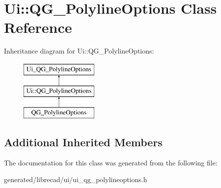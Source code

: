 \hypertarget{classUi_1_1QG__PolylineOptions}{\section{Ui\-:\-:Q\-G\-\_\-\-Polyline\-Options Class Reference}
\label{classUi_1_1QG__PolylineOptions}
}
Inheritance diagram for Ui\-:\-:Q\-G\-\_\-\-Polyline\-Options\-:\begin{figure}[H]
\begin{center}
\leavevmode
\includegraphics[height=3.000000cm]{classUi_1_1QG__PolylineOptions}
\end{center}
\end{figure}
\subsection*{Additional Inherited Members}


The documentation for this class was generated from the following file\-:\begin{DoxyCompactItemize}
\item 
generated/librecad/ui/ui\-\_\-qg\-\_\-polylineoptions.\-h\end{DoxyCompactItemize}
